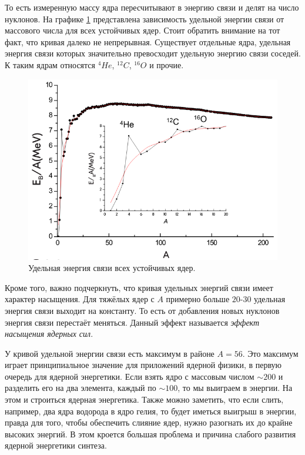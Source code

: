 \documentclass[12pt]{article}
\begin{document}
То есть измеренную массу ядра пересчитывают в энергию связи и делят на число нуклонов. На графике \ref{fig:4} представлена зависимость удельной энергии связи от массового числа для всех устойчивых ядер. Стоит обратить внимание на тот факт, что кривая далеко не непрерывная. Существует отдельные ядра, удельная энергия связи которых значительно превосходит удельную энергию связи соседей. К таким ядрам относятся ${}^4 He$, ${}^{12}C$, ${}^{16}O$ и прочие. 
\begin{figure}[ht]
	\centering
	\includegraphics[scale = 0.5]{fig4.png}
	\caption{Удельная энергия связи всех устойчивых ядер.}
	\label{fig:4}
\end{figure}
Кроме того, важно подчеркнуть, что кривая удельных энергий связи имеет характер насыщения. Для тяжёлых ядер с $A$ примерно больше $20$\--$30$ удельная энергия связи выходит на константу. То есть от добавления новых нуклонов энергия связи перестаёт меняться. Данный эффект называется \emph{эффект насыщения ядерных сил}.
\par
У кривой удельной энергии связи есть максимум в районе $A = 56$. Это максимум играет принципиальное значение для приложений ядерной физики, в первую очередь для ядерной энергетики. Если взять ядро с массовым числом $\sim 200$ и разделить его на два элемента, каждый по $\sim 100$, то мы выиграем в энергии. На этом и строиться ядерная энергетика. Также можно заметить, что если слить, например, два ядра водорода в ядро гелия, то будет иметься выигрыш в энергии, правда для того, чтобы обеспечить слияние ядер, нужно разогнать их до крайне высоких энергий. В этом кроется большая проблема и причина слабого развития ядерной энергетики синтеза.
\end{document}
